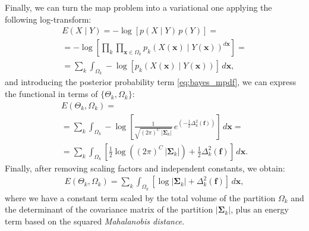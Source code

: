 Finally, we can turn the \gls{map} problem into a variational one
applying the following log-transform:
\begin{multline}
E(X \mid Y)= -\log \left[ p(X \mid Y) \, p(Y) \right] = \\
= -\log \left[ \underset{k}{\prod} \underset{\mathbf{x}\in \Omega_k}{\prod}
p_k( X(\mathbf{x}) \mid Y(\mathbf{x}) )^{d\mathbf{x}} \right] = \\
= \sum\limits_k \int_{\Omega_k} -\log \left[ p_k(X(\mathbf{x}) \mid Y(\mathbf{x} ) ) \right] \, d\mathbf{x},
\label{eq:energy_1}
\end{multline}
and introducing the posterior probability term \eqref{eq:bayes_mpdf}, 
we can express the functional in terms of $\lbrace\Theta_k,\Omega_k\rbrace$:
\begin{multline}
E(\Theta_k,\Omega_k) = \\
= \sum\limits_k \int_{\Omega_k} -\log \left[ \frac{1}{ \sqrt{(2\pi)^{C}\,\left|\boldsymbol{\Sigma}_{k}\right|}}\,{e^{\left(-\frac{1}{2}  \Delta^2_k (\mathbf{f}) \right)}} \right] \, d\mathbf{x} = \\
= \sum\limits_k \int_{\Omega_k} \left[ \frac{1}{2} \log{ \left( (2\pi)^{C}\,\left|\boldsymbol{\Sigma}_{k}\right| \right)} + \frac{1}{2}  \Delta^2_k (\mathbf{f}) \right] \,d\mathbf{x}.
\end{multline}
Finally, after removing scaling factors and independent constants,
we obtain:
\begin{align}
E(\Theta_k,\Omega_k) = \sum\limits_k \int_{\Omega_k} \left[ \log \left|\mathbf{\Sigma}_k\right| + \Delta^2_k (\mathbf{f}) \right] \,d\mathbf{x},
\label{eq:map_energy}
\end{align}
 where we have a constant term scaled by
the total volume of the partition $\Omega_k$ and the determinant of the 
covariance matrix of the partition $\left|\boldsymbol{\Sigma}_{k}\right|$,
plus an energy term based on the squared \emph{Mahalanobis distance}.


